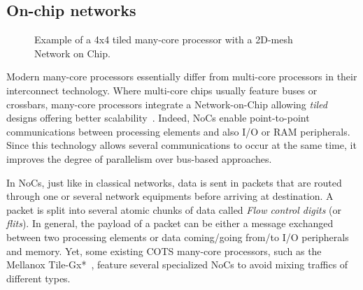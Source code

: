 \documentclass[main.tex]{subfiles}
\begin{document}

\subsection{On-chip networks}
\begin{figure}
    \centering
    \scalebox{0.7}{}
    \caption{Example of a 4x4 tiled many-core processor with a 2D-mesh Network on Chip.}
    \label{fig_stateOfTheArt_NoC}
\end{figure}
Modern many-core processors essentially differ from multi-core processors in their interconnect technology. Where multi-core chips usually feature buses or crossbars, many-core processors integrate a Network-on-Chip allowing \emph{tiled} designs offering better scalability~\cite{Taylor2007, Borkar2011}. Indeed, NoCs enable point-to-point communications between processing elements and also I/O or RAM peripherals. Since this technology allows several communications to occur at the same time, it improves the degree of parallelism over bus-based approaches.

In NoCs, just like in classical networks, data is sent in packets that are routed through one or several network equipments before arriving at destination. A packet is split into several atomic chunks of data called \emph{Flow control digits} (or \emph{flits}). In general, the payload of a packet can be either a message exchanged between two processing elements or data coming/going from/to I/O peripherals and memory. Yet, some existing COTS many-core processors, such as the Mellanox Tile-Gx*~\cite{TileGx}, feature several specialized NoCs to avoid mixing traffics of different types.
\end{document}
